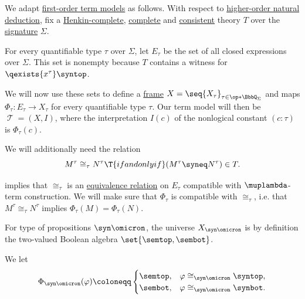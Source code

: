 \begin{definition}\label{def:hol_term_model}
  We adapt \hyperref[def:fol_term_model]{first-order term models} as follows. With respect to \hyperref[def:hol_natural_deduction_system]{higher-order natural deduction}, fix a \hyperref[def:hol_henkin_completeness]{Henkin-complete}, \hyperref[def:hol_theory/complete]{complete} and \hyperref[def:hol_theory/consistent]{consistent} theory \( T \) over the \hyperref[def:hol_signature]{signature} \( \Sigma \).

  For every quantifiable type \( \tau \) over \( \Sigma \), let \( E_\tau \) be the set of all closed expressions over \( \Sigma \). This set is nonempty because \( T \) contains a witness for \( \qexists {x^\tau} \syntop \).

  We will now use these sets to define a \hyperref[def:hol_frame]{frame} \( X = \seq{ X_\tau }_{\tau \in \op*{\BbbQ_\Sigma}} \) and maps \( \Phi_\tau: E_\tau \to X_\tau \) for every quantifiable type \( \tau \). Our term model will then be \( \mscrT = (X, I) \), where the interpretation \( I(c) \) of the nonlogical constant \( (c: \tau) \) is \( \Phi_\tau(c) \).

  We will additionally need the relation
  \begin{equation*}
    M^\tau \cong_\tau N^\tau \T{if and only if} (M^\tau \syneq N^\tau) \in T.
  \end{equation*}

   implies that \( {\cong_\tau} \) is an \hyperref[def:equivalence_relation]{equivalence relation} on \( E_\tau \) compatible with \( \muplambda \)-term construction. We will make sure that \( \Phi_\tau \) is compatible with \( {\cong_\tau} \), i.e. that \( M^\tau \cong_\tau N^\tau \) implies \( \Phi_\tau(M) = \Phi_\tau(N) \).

  \begin{thmenum}
     For type of propositions \( \syn\omicron \), the universe \( X_{\syn\omicron} \) is by definition the two-valued Boolean algebra \( \set{ \semtop, \sembot } \).

    We let
    \begin{equation*}
      \Phi_{\syn\omicron}(\varphi) \coloneqq \begin{cases}
        \semtop, &\varphi \cong_{\syn\omicron} \syntop, \\
        \sembot, &\varphi \cong_{\syn\omicron} \synbot.
      \end{cases}
    \end{equation*}


\end{thmenum}
\end{definition}
